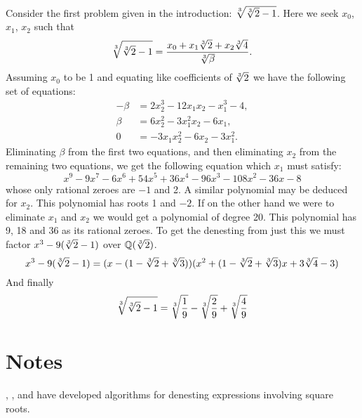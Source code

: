 Consider the first problem given in the introduction: 
$\root 3 \of {\root 3 \of 2 -1 }$.
Here we seek $x_0$, $x_1$, $x_2$ such that 
\[
\root 3 \of {\root 3 \of 2 -1 } =
\frac{x_0 + x_1 \root 3 \of 2 + x_2 \root 3 \of 4}{\root 3 \of \beta}.
\]
Assuming $x_0$ to be 1 and equating like coefficients of $\root 3 \of 2$
we have the following set of equations: \
\[
\begin{aligned}
- \beta &= 2 x_2^3 - 12x_1 x_2 - x_1^3 - 4,\\
\beta &= 6 x_2^2 - 3 x_1^2 x_2 - 6 x_1,\\
0 &= -3 x_1 x_2^2 - 6 x_2 - 3 x_1^2.
\end{aligned}
\]
Eliminating $\beta$ from the first two equations, and then eliminating $x_2$
from the remaining two equations, we get the following equation which $x_1$
must satisfy: 
\[
x^9 - 9 x^7 - 6 x^6 + 54 x^5 + 36 x^4 - 96 x^3 - 108 x^2 - 36 x - 8
\]
whose only rational zeroes are $-1$ and 2.  A similar polynomial may be deduced
for $x_2$.  This polynomial has roots 1 and $-2$.  If on the other
hand we were to eliminate $x_1$ and $x_2$ we would get a polynomial
of degree 20.  This polynomial has 9, 18 and 36 as its rational zeroes.
To get the denesting from just this we must
factor $x^3 - 9 (\root 3 \of 2 - 1)$ over $\Q(\root 3 \of 2)$.
\[
x^3 - 9(\root 3 \of 2 - 1) = (x - (1 - \root 3 \of 2 + \root 3 \of 3))
(x^2 + (1 - \root 3 \of 2 + \root 3 \of 3)x + 3 \root 3 \of 4 - 3)
\]
And finally 
\[
\root 3 \of {\root 3 \of 2 -1} = \root 3 \of {\frac{1}{9}} 
- \root 3 \of {\frac{2}{9}} + \root 3 \of {\frac{4}{9}}
\]


\section*{Notes}

\footnotesize

 {\Borodin}, {\Fagin},
{\Hopcroft} and {\Tompa} \cite{Borodin:Radicals} have developed
algorithms for denesting expressions involving square roots.

\normalsize
